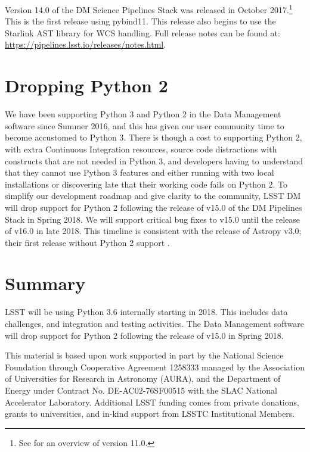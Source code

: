 \documentclass[11pt,twoside]{article}
\begin{document}
Version 14.0 of the DM Science Pipelines Stack was released in October 2017.\footnote{See \citet{P056_adassxxv} for an overview of version 11.0.}
This is the first release using pybind11.
This release also begins to use the Starlink AST library \citep{2016A&C....15...33B} for WCS handling.
Full release notes can be found at: \url{https://pipelines.lsst.io/releases/notes.html}.

\section{Dropping Python 2}

We have been supporting Python 3 and Python 2 in the Data Management software since Summer 2016, and this has given our user community time to become accustomed to Python 3.
There is though a cost to supporting Python 2, with extra Continuous Integration resources, source code distractions with constructs that are not needed in Python 3, and developers having to understand that they cannot use Python 3 features and either running with two local installations or discovering late that their working code fails on Python 2.
To simplify our development roadmap and give clarity to the community, LSST DM will drop support for Python 2 following the release of v15.0 of the DM  Pipelines Stack in Spring 2018.
We will support critical bug fixes to v15.0 until the release of v16.0 in late 2018. This timeline is consistent with the release of Astropy v3.0; their first release without Python 2 support \citep{APE10}.

\section{Summary}

LSST will be using Python 3.6 internally starting in 2018.
This includes data challenges, and integration and testing activities.
The Data Management software will drop support for Python 2 following the release of v15.0 in Spring 2018.

\acknowledgements This material is based upon work supported in part by the National Science Foundation through Cooperative Agreement 1258333 managed by the Association of Universities for Research in Astronomy (AURA), and the Department of Energy under Contract No. DE-AC02-76SF00515 with the SLAC National Accelerator Laboratory. Additional LSST funding comes from private donations, grants to universities, and in-kind support from LSSTC Institutional Members.

\end{document}
